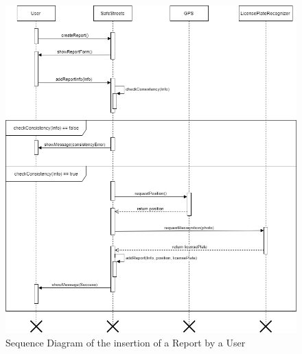     \begin{figure}[H]
        \centering
        \includegraphics[scale=0.5]{Images/SeqDiag_addReport.png}
        \caption{Sequence Diagram of the insertion of a Report by a User}
    \end{figure}
    
